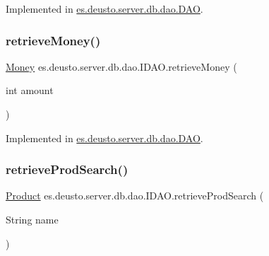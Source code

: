 Implemented in \hyperlink{classes_1_1deusto_1_1server_1_1db_1_1dao_1_1_d_a_o_a0ee6fd52276091b7e40129d1c484ef14}{es.\+deusto.\+server.\+db.\+dao.\+D\+AO}.

\mbox{\label{interfacees_1_1deusto_1_1server_1_1db_1_1dao_1_1_i_d_a_o_a1386c2e329277fc36575b0450a0e8997}} 
\subsubsection{\texorpdfstring{retrieve\+Money()}{retrieveMoney()}}
{\footnotesize\ttfamily \hyperlink{classes_1_1deusto_1_1server_1_1db_1_1data_1_1_money}{Money} es.\+deusto.\+server.\+db.\+dao.\+I\+D\+A\+O.\+retrieve\+Money (\begin{DoxyParamCaption}\item[{int}]{amount }\end{DoxyParamCaption})}



Implemented in \hyperlink{classes_1_1deusto_1_1server_1_1db_1_1dao_1_1_d_a_o_a171a709ad2008e5eea8a77db494df1d0}{es.\+deusto.\+server.\+db.\+dao.\+D\+AO}.

\mbox{\label{interfacees_1_1deusto_1_1server_1_1db_1_1dao_1_1_i_d_a_o_a9ba3fce5b0679bb1068484734fe0ed02}} 
\subsubsection{\texorpdfstring{retrieve\+Prod\+Search()}{retrieveProdSearch()}}
{\footnotesize\ttfamily \hyperlink{classes_1_1deusto_1_1server_1_1db_1_1data_1_1_product}{Product} es.\+deusto.\+server.\+db.\+dao.\+I\+D\+A\+O.\+retrieve\+Prod\+Search (\begin{DoxyParamCaption}\item[{String}]{name }\end{DoxyParamCaption})}



